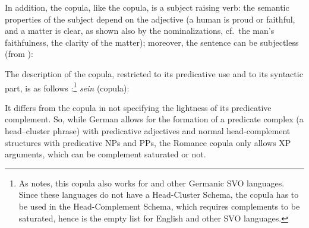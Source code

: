     \label{GSexemple47c}
		     
	\label{GSexemple47d}
\zl

In addition, the  copula, like the  copula, is a subject raising verb: the semantic properties of the subject depend on the adjective (a human is proud or faithful, and a matter is clear, as shown also by the nominalizations, cf.\ the man's faithfulness, the clarity of the matter); moreover, the sentence can be subjectless (from \citealt[72]{Mueller2002b}): 

\z

The description of the  copula, restricted to its predicative use and to its syntactic
part, is as follows \citep[]{MuellerPredication}:\footnote{
  As \citet[]{MuellerPredication} notes, this copula also works for  and
    other Germanic SVO languages. Since these languages do not have a Head-Cluster Schema, the
    copula has to be used in the Head-Complement Schema, which requires complements to be saturated,
    hence  is the empty list for English and other  SVO languages.
}
\ea
\label{GSexemple49}
\emph{sein} (copula): \\
\z

\noindent
It differs from the  copula in not specifying the lightness of its predicative
complement. So, while German allows for the formation of a predicate complex (a head–cluster phrase) with predicative
  adjectives and normal head-complement structures with predicative NPs and PPs, the Romance copula only
  allows XP arguments, which can be complement saturated or not.

